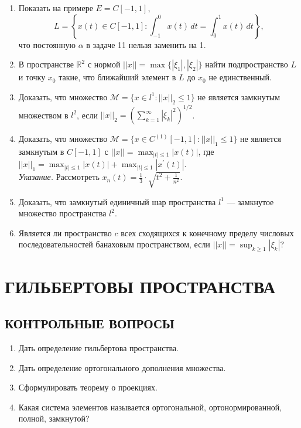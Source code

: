 \documentclass[12pt,a4paper]{article}
\begin{document}
\begin{enumerate}
\textit{Указание.} Использовать задачу 11.
\item Показать на примере $E=C[-1,1]$,
$$L=\left\{x(t)\in C[-1,1] : \int_{-1}^{0}x(t) \, dt=\int_{0}^{1}x(t) \, dt\right\},$$
что постоянную $\alpha$ в задаче 11 нельзя заменить на 1.
\item В пространстве $\mathbb{R}^{2}$ с нормой $||x||=\max\{|\xi_{1}|,|\xi_{2}|\}$ найти подпространство $L$ и точку $x_{0}$ такие, что ближайший элемент в $L$ до $x_{0}$ не единственный.
\item Доказать, что множество $\mathcal{M}=\{x\in l^{1}:||x||_{2}\le1\}$ не является замкнутым множеством в $l^{2}$, если $||x||_{2}=\left(\sum_{k=1}^{\infty}|\xi_{k}|^{2}\right)^{1/2}$.
\item Доказать, что множество $\mathcal{M}=\{x\in C^{(1)}[-1,1]:||x||_{1}\le1\}$ не является замкнутым в $C[-1,1]$ с $||x||=\max_{|t|\le1}|x(t)|$, где $||x||_{1}=\max_{|t|\le1}|x(t)|+\max_{|t|\le1}|x^{\prime}(t)|$.\\
\textit{Указание.} Рассмотреть $x_{n}(t)=\frac{1}{3}\cdot\sqrt{t^{2}+\frac{1}{n^{2}}}$.
\item Доказать, что замкнутый единичный шар пространства $l^{1}$ — замкнутое множество пространства $l^{2}$.
\item Является ли пространство $c$ всех сходящихся к конечному пределу числовых последовательностей банаховым пространством, если $||x||=\sup_{k\ge1}|\xi_{k}|$?
\end{enumerate}

\section{ГИЛЬБЕРТОВЫ ПРОСТРАНСТВА}

\subsection*{КОНТРОЛЬНЫЕ ВОПРОСЫ}
\begin{enumerate}
\item Дать определение гильбертова пространства.
\item Дать определение ортогонального дополнения множества.
\item Сформулировать теорему о проекциях.
\item Какая система элементов называется ортогональной, ортонормированной, полной, замкнутой?
\end{enumerate}
\end{document}
